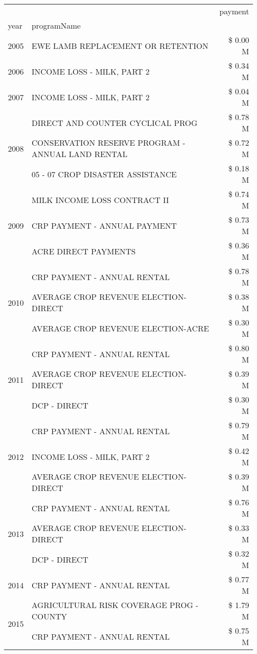 \begin{tabular}{llr}
\toprule
 &  & payment \\
year & programName &  \\
\midrule
2005 & EWE LAMB REPLACEMENT OR RETENTION & \$ 0.00 M \\
\cline{1-3}
2006 & INCOME LOSS - MILK, PART 2 & \$ 0.34 M \\
\cline{1-3}
2007 & INCOME LOSS - MILK, PART 2 & \$ 0.04 M \\
\cline{1-3}
\multirow[t]{3}{*}{2008} & DIRECT AND COUNTER CYCLICAL PROG & \$ 0.78 M \\
 & CONSERVATION RESERVE PROGRAM - ANNUAL LAND RENTAL & \$ 0.72 M \\
 & 05 - 07 CROP DISASTER ASSISTANCE & \$ 0.18 M \\
\cline{1-3}
\multirow[t]{3}{*}{2009} & MILK INCOME LOSS CONTRACT II & \$ 0.74 M \\
 & CRP PAYMENT - ANNUAL PAYMENT & \$ 0.73 M \\
 & ACRE DIRECT PAYMENTS & \$ 0.36 M \\
\cline{1-3}
\multirow[t]{3}{*}{2010} & CRP PAYMENT - ANNUAL RENTAL & \$ 0.78 M \\
 & AVERAGE CROP REVENUE ELECTION-DIRECT & \$ 0.38 M \\
 & AVERAGE CROP REVENUE ELECTION-ACRE & \$ 0.30 M \\
\cline{1-3}
\multirow[t]{3}{*}{2011} & CRP PAYMENT - ANNUAL RENTAL & \$ 0.80 M \\
 & AVERAGE CROP REVENUE ELECTION-DIRECT & \$ 0.39 M \\
 & DCP - DIRECT & \$ 0.30 M \\
\cline{1-3}
\multirow[t]{3}{*}{2012} & CRP PAYMENT - ANNUAL RENTAL & \$ 0.79 M \\
 & INCOME LOSS - MILK, PART 2 & \$ 0.42 M \\
 & AVERAGE CROP REVENUE ELECTION-DIRECT & \$ 0.39 M \\
\cline{1-3}
\multirow[t]{3}{*}{2013} & CRP PAYMENT - ANNUAL RENTAL & \$ 0.76 M \\
 & AVERAGE CROP REVENUE ELECTION-DIRECT & \$ 0.33 M \\
 & DCP - DIRECT & \$ 0.32 M \\
\cline{1-3}
2014 & CRP PAYMENT - ANNUAL RENTAL & \$ 0.77 M \\
\cline{1-3}
\multirow[t]{3}{*}{2015} & AGRICULTURAL RISK COVERAGE PROG - COUNTY & \$ 1.79 M \\
 & CRP PAYMENT - ANNUAL RENTAL & \$ 0.75 M \\

\end{tabular}
